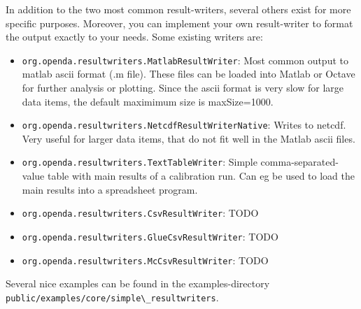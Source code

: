In addition to the two most common result-writers, several others exist for
more specific purposes. Moreover, you can implement your own result-writer to
format the output exactly to your needs. Some existing writers are:
\begin{itemize}
\item {\tt org.openda.resultwriters.MatlabResultWriter}: Most common output to
matlab ascii format (.m file). These files can be loaded into Matlab or Octave
for further analysis or plotting. Since the ascii format is very slow for large
data items, the default maximimum size is maxSize=1000.
\item {\tt org.openda.resultwriters.NetcdfResultWriterNative}: Writes to netcdf.
Very useful for larger data items, that do not fit well in the Matlab ascii
files.
\item {\tt org.openda.resultwriters.TextTableWriter}: Simple
comma-separated-value table with main results of a calibration run. Can eg be
used to load the main results into a spreadsheet program.
\item {\tt org.openda.resultwriters.CsvResultWriter}: TODO
\item {\tt org.openda.resultwriters.GlueCsvResultWriter}: TODO
\item {\tt org.openda.resultwriters.McCsvResultWriter}: TODO
\end{itemize}


Several nice examples can be found in the examples-directory\\
\verb|public/examples/core/simple\_resultwriters|.

